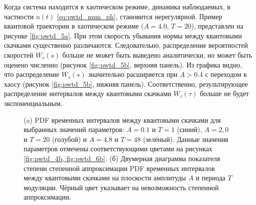 Когда система находится в хаотическом режиме, динамика наблюдаемых, в частности $n(t)$ \cref{eq:pwtd_num_ph}, становится нерегулярной. 
Пример квантовой траектории в хаотическом режиме ($A = 4.0$, $T = 20$), представлен на рисунке \cref{fig:pwtd_5a}. 
При этом скорость убывания нормы между квантовыми скачками существенно различаются. 
Следовательно, распределение вероятностей скоростей $W_s(s)$ больше не может быть выведено аналитически, но может быть оценено численно (рисунок \cref{fig:pwtd_5b}, верхняя панель). 
Из графика видно, что распределение $W_s(s)$ значительно расширяется при $A > 0.4$ с переходом к хаосу (рисунок \cref{fig:pwtd_5b}, нижняя панель).
Соответственно, результирующее распределение интервалов между квантовыми скачками $W_\tau(\tau)$ больше не будет экспоненциальным.

\begin{figure}[h]
	\legend{}
	\caption[Распределения временных интервалов между последовательными испусканиями фотонов их квантового резонатора]
	{
		(a) PDF временных интервалов между квантовыми скачками для выбранных значений параметров: $A = 0.1$ и $T = 1$ (синий), $A = 2,0$ и $T = 20$ (голубой) и $A = 4.8$ и $T = 48$ (зелёный). Данные значения параметров отмечены соответствующими цветами на рисунках \cref{fig:pwtd_4b, fig:pwtd_6b}.
		(б) Двумерная диаграмма показателя степени степенной аппроксимации PDF временных интервалов между квантовыми скачками на плоскости амплитуды $A$ и периода $T$ модуляции. Чёрный цвет указывает на невозможность степенной аппроксимации.
	}
	\label{fig:pwtd_6}
\end{figure}

